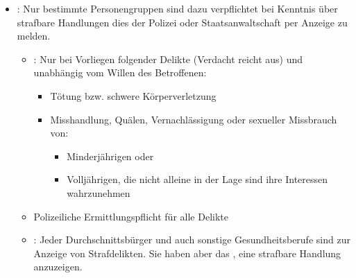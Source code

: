{\begin{itemize}
{\begin{itemize}
   Befürchtung, dass sich die Krankheit weiterverbreiten
   würde oder sich der Patient einer Heilbehandlung
   entziehen würde.
   \item {}:  Meldepflicht
   erst ab manifester Erkrankung mit AIDS (=~bei sichtbaren
   Krankheitszeichen; nicht schon bei HIV-Infektion) oder
   Todesfall mit erkennbaren AIDS typischen
   Krankheiten\footnote{s.
   }.
   Es gibt  Untersuchungs- oder Behandlungspflicht,
   daher darf kein behördlicher Zwang ausgeübt werden \item
   nach  des Gesundheitsministerium:
   Da sich ständig neue übertragbare Krankheiten\footnote{in
   letzter Zeit z.\,B.
   , , 
   ()} entwickeln, gibt das
   Gesundheitsministerium in unregelmäßigen  Abständen
   Verordnungen heraus, die eine Meldepflicht beinhalten.
  \end{itemize}
  
  Nicht jeder Durchschnittsbürger ist zur Meldung
  verpflichtet, sondern nur besondere Personengruppen
  worunter aber alle Gesundheitsberufe fallen.
  
  Die Meldung hat bei AIDS an das Bundesministerium für
  Gesundheit zu ergehen, ansonsten an die zuständige
  Bezirksverwaltungsbehörde (in Wien an die MA\,15).
  }
  \item {}:\label{topic:anzeigepflicht}
  Nur bestimmte Personengruppen sind dazu verpflichtet bei Kenntnis über
  strafbare Handlungen dies der Polizei oder Staatsanwaltschaft per
  Anzeige zu melden.
  
  \begin{itemize}
    \item {}:
    Nur bei Vorliegen folgender Delikte (Verdacht reicht aus) und
    unabhängig vom Willen des Betroffenen:
    \begin{itemize}
      \item Tötung bzw. schwere Körperverletzung
      \item Misshandlung, Quälen, Vernachlässigung oder
      sexueller Missbrauch
      von:
      \begin{itemize}
        \item Minderjährigen oder
        \item Volljährigen, die nicht alleine in der Lage
        sind ihre Interessen
        wahrzunehmen
      \end{itemize}
    \end{itemize}
    \item Polizeiliche Ermittlungspflicht
    für alle Delikte
  \item {}:
  \label{topic:anzeigerecht}
  Jeder Durchschnittsbürger und auch sonstige Gesundheitsberufe sind
   zur Anzeige von Strafdelikten. Sie
  haben aber das
  , eine strafbare Handlung anzuzeigen.
  

\end{itemize}
\end{itemize}}

